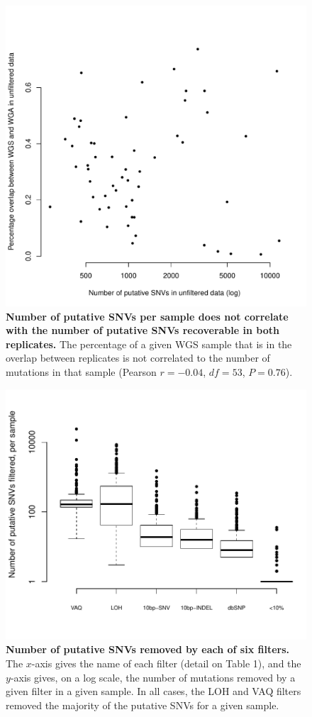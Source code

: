 \documentclass[11 pt]{article} %
\begin{document}
\begin{figure}
\centerline{
\includegraphics[width=5in]{Figure4.pdf} }
\caption{\textbf{Number of putative SNVs per sample does not correlate with the number of putative SNVs recoverable in both replicates.} The percentage of a given WGS sample that is in the overlap between replicates is not correlated to the number of mutations in that sample (Pearson $r=-0.04$, $df=53$, $P=0.76$).}
\label{fig:unfiltered_total_muts}
\end{figure}

\begin{figure}
\centerline{
\includegraphics[width=6in]{Figure5.pdf} }
\caption{\textbf{Number of putative SNVs removed by each of six filters.} The $x$-axis gives the name of each filter (detail on Table 1), and the $y$-axis gives, on a log scale, the number of mutations removed by a given filter in a given sample. In all cases, the LOH and VAQ filters removed the majority of the putative SNVs for a given sample.}
\label{fig:boxplot_number_filtered}
\end{figure}
\end{document}
